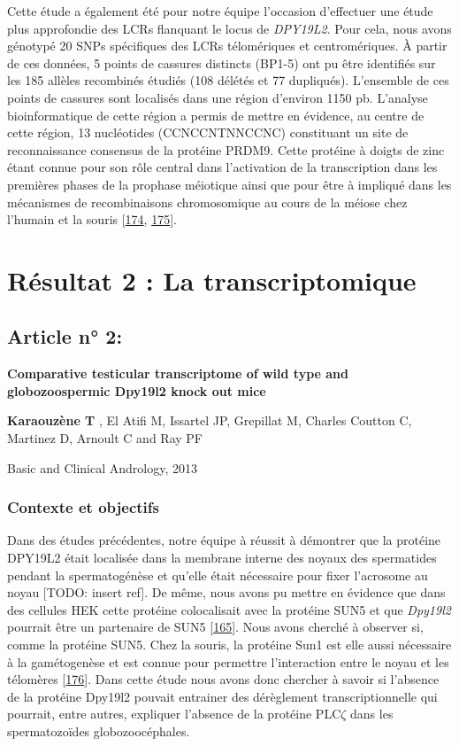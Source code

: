 \documentclass[12pt,twoside]{ugathesis}
\theoremstyle{definition}
\theoremstyle{definition}
\theoremstyle{remark}
\begin{document}
Cette étude a également été pour notre équipe l'occasion d'effectuer une
étude plus approfondie des LCRs flanquant le locus de \emph{DPY19L2}.
Pour cela, nous avons génotypé 20 SNPs spécifiques des LCRs télomériques
et centromériques. À partir de ces données, 5 points de cassures
distincts (BP1-5) ont pu être identifiés sur les 185 allèles recombinés
étudiés (108 délétés et 77 dupliqués). L'ensemble de ces points de
cassures sont localisés dans une région d'environ 1150 pb. L'analyse
bioinformatique de cette région a permis de mettre en évidence, au
centre de cette région, 13 nucléotides (CCNCCNTNNCCNC) constituant un
site de reconnaissance consensus de la protéine PRDM9. Cette protéine à
doigts de zinc étant connue pour son rôle central dans l'activation de
la transcription dans les premières phases de la prophase méiotique
ainsi que pour être à impliqué dans les mécanismes de recombinaisons
chromosomique au cours de la méiose chez l'humain et la souris
{[}\protect\hyperlink{ref-Parvanov2010}{174},
\protect\hyperlink{ref-Baudat2010}{175}{]}.

\newpage

\section{Résultat 2 : La transcriptomique}\label{transcriptome}

\subsection{Article n° 2:}\label{article-n-2}

\textbf{Comparative testicular transcriptome of wild type and
globozoospermic Dpy19l2 knock out mice}

\textbf{Karaouzène T} , El Atifi M, Issartel JP, Grepillat M, Charles
Coutton C, Martinez D, Arnoult C and Ray PF

Basic and Clinical Andrology, 2013

\newpage

\subsubsection{Contexte et objectifs}\label{contexte-et-objectifs-1}

Dans des études précédentes, notre équipe à réussit à démontrer que la
protéine DPY19L2 était localisée dans la membrane interne des noyaux des
spermatides pendant la spermatogénèse et qu'elle était nécessaire pour
fixer l'acrosome au noyau {[}TODO: insert ref{]}. De même, nous avons pu
mettre en évidence que dans des cellules HEK cette protéine colocalisait
avec la protéine SUN5 et que \emph{Dpy19l2} pourrait être un partenaire
de SUN5 {[}\protect\hyperlink{ref-Pierre2012}{165}{]}. Nous avons
cherché à observer si, comme la protéine SUN5. Chez la souris, la
protéine Sun1 est elle aussi nécessaire à la gamétogenèse et est connue
pour permettre l'interaction entre le noyau et les télomères
{[}\protect\hyperlink{ref-Ding2007}{176}{]}. Dans cette étude nous avons
donc chercher à savoir si l'absence de la protéine Dpy19l2 pouvait
entrainer des dérèglement transcriptionnelle qui pourrait, entre autres,
expliquer l'absence de la protéine PLC\(\zeta\) dans les spermatozoïdes
globozoocéphales.
\end{document}
